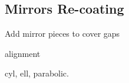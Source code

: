 \subsection{Mirrors Re-coating}


Add mirror pieces to cover gaps



alignment


cyl, ell, parabolic.


